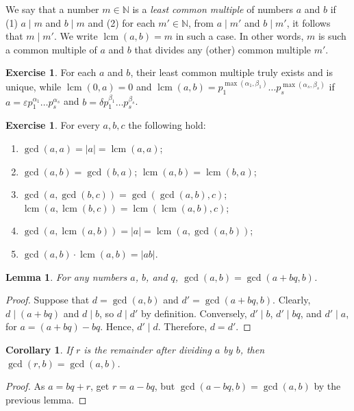 \documentclass[12pt,notitlepage]{article}
\theoremstyle{plain}
\newtheorem{lemma}[thm]{Lemma}
\newtheorem{corr}[thm]{Corollary}
\theoremstyle{definition}
\newtheorem{exc}[thm]{Exercise}
\theoremstyle{plain}
\newcommand{\N}{\mathbb{N}}
\newcommand{\eps}{\varepsilon}
\newcommand{\1}{\mathbf{1}}
\newcommand{\0}{\mathbf{0}}
\newcommand{\dvd}{\mathop{\mid}}
\DeclareMathOperator{\lcm}{lcm}
\newcommand{\mcomm}[1]{}
\begin{document}
We say that a number $m \in \N$ is a \emph{least common multiple} of numbers $a$ and $b$ if (1) $a \dvd m$ and $b \dvd m$ and (2) for each $m' \in \N$, from $a \dvd m'$ and $b \dvd m'$, it follows that $m \dvd m'$. We write $\lcm (a, b) = m$ in such a case. In other words, $m$ is such a common multiple of $a$ and $b$ that divides any (other) common multiple $m'$.
\begin{exc}
For each $a$ and $b$, their least common multiple truly exists and is unique, while $\lcm(0, a) = 0$ and $\lcm(a, b) = p^{\max(\alpha_1, \beta_1)}_1\ldots p^{\max(\alpha_s, \beta_s)}_s$ if $a = \eps p^{\alpha_1}_1\ldots p^{\alpha_s}_s$ and $b = \delta p^{\beta_1}_1\ldots p^{\beta_s}_s$.
\end{exc}
\mcomm{There is a clear similarity between $\gcd$ and minimum (respectively, $\lcm$ and maximum)---since both are infima for suitable posets (we will elaborate on the idea later). The Instructor might want to highlight this fact.}
\begin{exc} For every $a, b, c$ the following hold:
\begin{enumerate}
\item $\gcd(a, a) = |a| = \lcm(a, a)$;
\item $\gcd(a, b) = \gcd(b,a)$; $\lcm(a, b) = \lcm(b,a)$;
\item $\gcd(a, \gcd(b, c)) = \gcd(\gcd(a, b), c)$; $\lcm(a, \lcm(b, c)) = \lcm(\lcm(a, b), c)$;
\item $\gcd(a, \lcm(a, b)) = |a| = \lcm(a, \gcd(a, b))$;
\item $\gcd(a,b)\cdot \lcm(a, b) = |ab|$.
\end{enumerate}
\end{exc}

\begin{lemma}
For any numbers $a$, $b$, and $q$, $\gcd(a, b) = \gcd(a + bq, b)$.
\end{lemma}
\begin{proof}
Suppose that $d = \gcd(a,b)$ and $d' = \gcd(a + bq, b)$. Clearly, $d \dvd (a + bq)$ and $d \dvd b$, so $d \dvd d'$ by definition. Conversely, $d' \dvd b$, $d' \dvd bq$, and $d' \dvd a$, for $a = (a + bq) - bq$. Hence, $d' \dvd d$. Therefore, $d = d'$.
\end{proof}

\begin{corr}\label{L5:c_gcd_rem}
If $r$ is the remainder after dividing $a$ by $b$, then $\gcd(r, b) = \gcd(a, b)$.
\end{corr}
\begin{proof}
As $a = bq + r$, get $r = a - bq$, but $\gcd(a - bq, b) = \gcd(a, b)$ by the previous lemma.
\end{proof}
\end{document}

